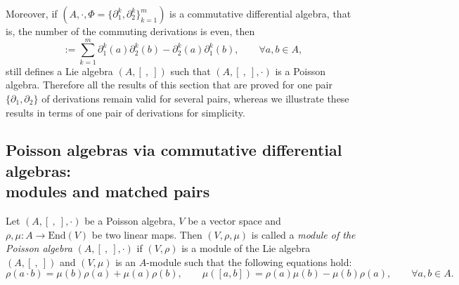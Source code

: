 \documentclass[pdftex]{sigma}
\numberwithin{equation}{section}
\newcommand{\End}{\mathrm{End}}
\begin{document}
Moreover, if $(A, \cdot, \Phi = \{\partial_1^k, \partial_2^k\}_{k=1}^m)$ is a commutative differential algebra,
that is, the number of the commuting derivations is even, then
\begin{equation*}
	[a, b] := \sum_{k=1}^m \partial^k_1(a) \partial^k_2(b) - \partial^k_2(a) \partial^k_1(b),\qquad \forall a, b \in A,
\end{equation*}
still defines a Lie algebra $(A,[\ ,\ ])$ such that $(A, [\ ,\ ], \cdot)$ is a Poisson algebra.
Therefore all the results of this section that are proved for one pair $\{\partial_1, \partial_2\}$ of derivations remain valid for several pairs,
whereas we illustrate these results in terms of one pair of derivations for simplicity.

\subsection[Poisson algebras via commutative differential algebras: modules and matched pairs]{Poisson algebras via commutative differential algebras:\\ modules and matched pairs}

\begin{Definition}
 Let $(A, [\ ,\ ], \cdot)$ be a Poisson algebra, $V$ be a vector space and $\rho, \mu\colon A \to \End (V)$ be two linear maps.
 Then $(V, \rho, \mu)$ is called a \textit{module of the Poisson algebra} $(A, [\ ,\ ], \cdot)$
 if $(V, \rho)$ is a module of the Lie algebra $(A, [\ ,\ ])$
 and $(V, \mu)$ is an $A$-module such that the following equations hold:
 \begin{equation*}
 \rho(a \cdot b) = \mu(b) \rho(a) + \mu(a) \rho(b), \qquad \mu([a,b])= \rho(a) \mu(b) - \mu(b) \rho(a), \qquad \forall a,b\in A.
 \end{equation*}
\end{Definition}
\end{document}

